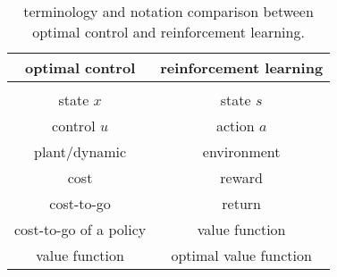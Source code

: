\begin{table}[bt]
	\centering 
	\caption{terminology and notation comparison between optimal control and reinforcement learning.} \label{tab:RLterms}
	\begin{tabular}{c c}
		\textbf{optimal control} & \textbf{reinforcement learning} \\ \hline \hline \\ [-1.8ex]
		state $x$ & state $s$ \\
		control $u$ & action $a$ \\
		plant/dynamic & environment \\
		cost & reward \\
		cost-to-go & return \\
		cost-to-go of a policy & value function \\
		value function & optimal value function
	\end{tabular}
\end{table}